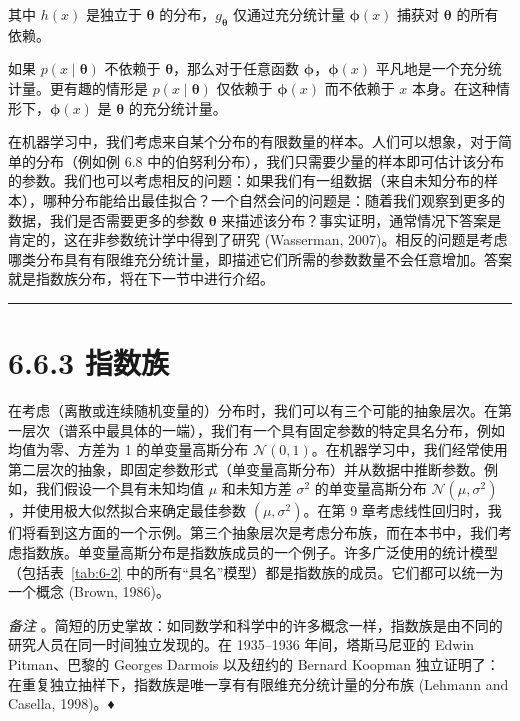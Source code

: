 其中 $ h(x) $ 是独立于 $ \boldsymbol{\theta} $ 的分布，$ g_{\boldsymbol{\theta}} $ 仅通过充分统计量 $ \boldsymbol{\phi}(x) $ 捕获对 $ \boldsymbol{\theta} $ 的所有依赖。

如果 $ p(x \mid \boldsymbol{\theta}) $ 不依赖于 $ \boldsymbol{\theta} $，那么对于任意函数 $ \boldsymbol{\phi} $，$ \boldsymbol{\phi}(x) $ 平凡地是一个充分统计量。更有趣的情形是 $ p(x \mid \boldsymbol{\theta}) $ 仅依赖于 $ \boldsymbol{\phi}(x) $ 而不依赖于 $ x $ 本身。在这种情形下，$ \boldsymbol{\phi}(x) $ 是 $ \boldsymbol{\theta} $ 的充分统计量。

在机器学习中，我们考虑来自某个分布的有限数量的样本。人们可以想象，对于简单的分布（例如例 6.8 中的伯努利分布），我们只需要少量的样本即可估计该分布的参数。我们也可以考虑相反的问题：如果我们有一组数据（来自未知分布的样本），哪种分布能给出最佳拟合？一个自然会问的问题是：随着我们观察到更多的数据，我们是否需要更多的参数 $ \boldsymbol{\theta} $ 来描述该分布？事实证明，通常情况下答案是肯定的，这在非参数统计学中得到了研究 (Wasserman, 2007)。相反的问题是考虑哪类分布具有有限维充分统计量，即描述它们所需的参数数量不会任意增加。答案就是指数族分布，将在下一节中进行介绍。

\medskip\hrule\medskip

\section*{6.6.3 指数族}

在考虑（离散或连续随机变量的）分布时，我们可以有三个可能的抽象层次。在第一层次（谱系中最具体的一端），我们有一个具有固定参数的特定具名分布，例如均值为零、方差为 1 的单变量高斯分布 $ \mathcal{N}(0, 1) $。在机器学习中，我们经常使用第二层次的抽象，即固定参数形式（单变量高斯分布）并从数据中推断参数。例如，我们假设一个具有未知均值 $ \mu $ 和未知方差 $ \sigma^2 $ 的单变量高斯分布 $ \mathcal{N}(\mu, \sigma^2) $，并使用极大似然拟合来确定最佳参数 $ (\mu, \sigma^2) $。在第 9 章考虑线性回归时，我们将看到这方面的一个示例。第三个抽象层次是考虑分布族，而在本书中，我们考虑指数族。单变量高斯分布是指数族成员的一个例子。许多广泛使用的统计模型（包括表~\ref{tab:6-2} 中的所有“具名”模型）都是指数族的成员。它们都可以统一为一个概念 (Brown, 1986)。

\emph{备注} 。简短的历史掌故：如同数学和科学中的许多概念一样，指数族是由不同的研究人员在同一时间独立发现的。在 1935–1936 年间，塔斯马尼亚的 Edwin Pitman、巴黎的 Georges Darmois 以及纽约的 Bernard Koopman 独立证明了：在重复独立抽样下，指数族是唯一享有有限维充分统计量的分布族 (Lehmann and Casella, 1998)。♦

